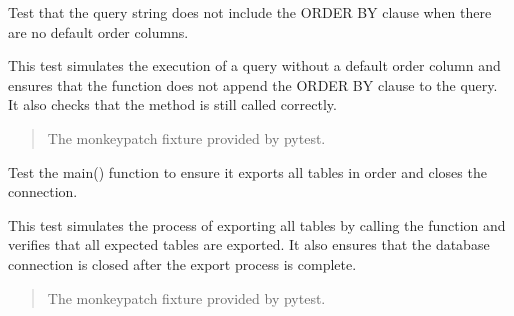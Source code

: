 \documentclass[letterpaper,10pt,english]{sphinxmanual}
\begin{document}
\begin{fulllineitems}
\label{\detokenize{test.data_storage:test.data_storage.test_data_export.test_export_table_query_without_order}}
\pysigstartsignatures
\pysiglinewithargsret
{}
{}
{}
\pysigstopsignatures
\sphinxAtStartPar
Test that the query string does not include the ORDER BY clause
when there are no default order columns.

\sphinxAtStartPar
This test simulates the execution of a query without a default order
column and ensures that the  function does not
append the ORDER BY clause to the query. It also checks that the
 method is still called correctly.
\begin{quote}\begin{description}
\sphinxAtStartPar
{} \textendash{} The monkeypatch fixture provided by pytest.

\end{description}\end{quote}

\end{fulllineitems}


\begin{fulllineitems}
\label{\detokenize{test.data_storage:test.data_storage.test_data_export.test_main_exports_all_tables}}
\pysigstartsignatures
\pysiglinewithargsret
{}
{}
{}
\pysigstopsignatures
\sphinxAtStartPar
Test the main() function to ensure it exports all tables in order
and closes the connection.

\sphinxAtStartPar
This test simulates the process of exporting all tables by calling
the  function and verifies that all expected tables are exported.
It also ensures that the database connection is closed after the export
process is complete.
\begin{quote}\begin{description}
\sphinxAtStartPar
{} \textendash{} The monkeypatch fixture provided by pytest.

\end{description}\end{quote}

\end{fulllineitems}
\end{document}
